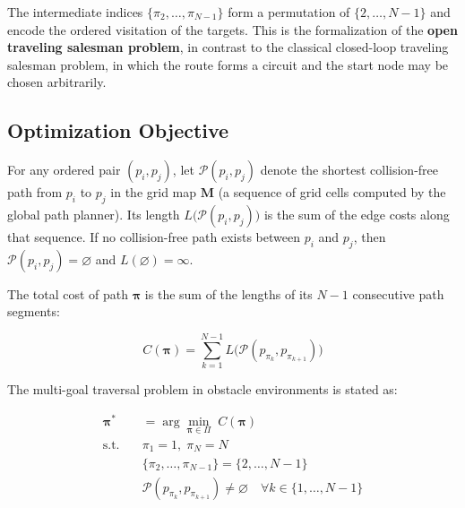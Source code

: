 \documentclass[lettersize,journal]{IEEEtran}
\begin{document}
The intermediate indices $\{\pi_2, \dots, \pi_{N-1}\}$ form a permutation of $\{2, \dots, N-1\}$ and encode the ordered visitation of the targets. This is the formalization of the \textbf{open traveling salesman problem}, in contrast to the classical closed-loop traveling salesman problem, in which the route forms a circuit and the start node may be chosen arbitrarily\textcolor{blue}{\cite{ref4,ref36}}.

\subsection{Optimization Objective}

For any ordered pair $(p_i, p_j)$, let $\mathcal{P}(p_i, p_j)$ denote the shortest collision-free path from $p_i$ to $p_j$ in the grid map $\mathbf{M}$ (a sequence of grid cells computed by the global path planner). Its length $L\big(\mathcal{P}(p_i, p_j)\big)$ is the sum of the edge costs along that sequence. If no collision-free path exists between $p_i$ and $p_j$, then $\mathcal{P}(p_i, p_j) = \varnothing$ and $L(\varnothing) = \infty$.

The total cost of path $\bm{\pi}$ is the sum of the lengths of its $N-1$ consecutive path segments:

\begin{equation}
C(\bm{\pi}) = \sum_{k=1}^{N-1} L\big(\mathcal{P}(p_{\pi_k}, p_{\pi_{k+1}})\big)
\label{eq:totalcost}
\end{equation}

The multi-goal traversal problem in obstacle environments is stated as:

\begin{align}
\bm{\pi}^{*} &= \arg\min_{\bm{\pi} \in \Pi} \; C(\bm{\pi})
\label{eq:opt}\\
\text{s.t.} \quad &\pi_1 = 1,\; \pi_N = N \nonumber\\
&\{\pi_2, \dots, \pi_{N-1}\} = \{2, \dots, N-1\} \nonumber\\
&\mathcal{P}(p_{\pi_k}, p_{\pi_{k+1}}) \neq \varnothing \quad \forall k \in \{1, \dots, N-1\} \nonumber
\end{align}
\end{document}
